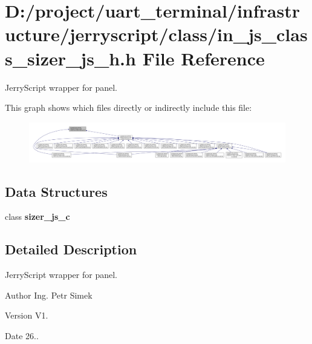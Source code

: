\section{D\+:/project/uart\+\_\+terminal/infrastructure/jerryscript/class/in\+\_\+js\+\_\+class\+\_\+sizer\+\_\+js\+\_\+h.h File Reference}
\label{in__js__class__sizer__js__h_8h}


Jerry\+Script wrapper for panel.  


This graph shows which files directly or indirectly include this file\+:
\nopagebreak
\begin{figure}[H]
\begin{center}
\leavevmode
\includegraphics[width=350pt]{in__js__class__sizer__js__h_8h__dep__incl}
\end{center}
\end{figure}
\subsection*{Data Structures}
\begin{DoxyCompactItemize}
\item 
class \textbf{ sizer\+\_\+js\+\_\+c}
\end{DoxyCompactItemize}


\subsection{Detailed Description}
Jerry\+Script wrapper for panel. 

\begin{DoxyAuthor}{Author}
Ing. Petr Simek 
\end{DoxyAuthor}
\begin{DoxyVersion}{Version}
V1. 
\end{DoxyVersion}
\begin{DoxyDate}{Date}
26.. 
\end{DoxyDate}
